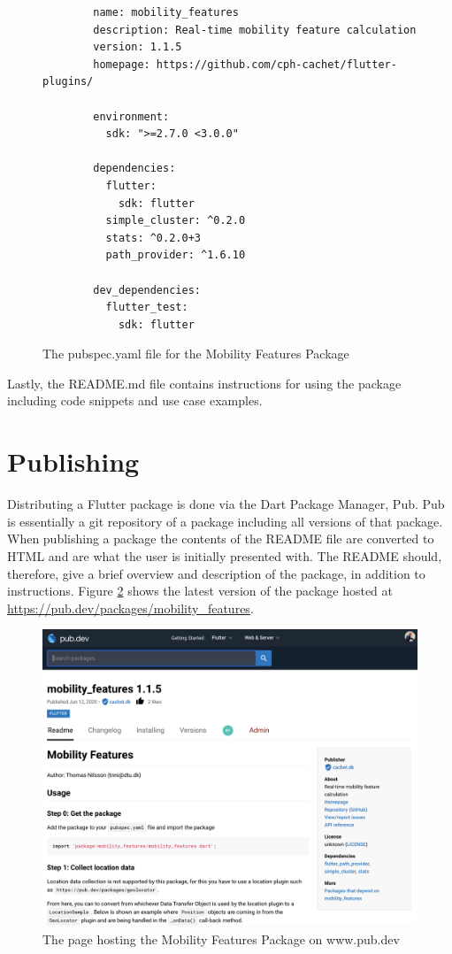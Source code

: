 \begin{figure}
    \centering
    \begin{verbatim}
        name: mobility_features
        description: Real-time mobility feature calculation
        version: 1.1.5
        homepage: https://github.com/cph-cachet/flutter-plugins/
        
        environment:
          sdk: ">=2.7.0 <3.0.0"
        
        dependencies:
          flutter:
            sdk: flutter
          simple_cluster: ^0.2.0
          stats: ^0.2.0+3
          path_provider: ^1.6.10
        
        dev_dependencies:
          flutter_test:
            sdk: flutter
    \end{verbatim}
    \caption{The pubspec.yaml file for the Mobility Features Package}
    \label{fig:pubspec}
\end{figure}

Lastly, the README.md file contains instructions for using the package including code snippets and use case examples. 

\section{Publishing}
Distributing a Flutter package is done via the Dart Package Manager, Pub. Pub is essentially a git repository of a package including all versions of that package. When publishing a package the contents of the README file are converted to HTML and are what the user is initially presented with. The README should, therefore, give a brief overview and description of the package, in addition to instructions. Figure \ref{fig:pub-package} shows the latest version of the package hosted at \url{https://pub.dev/packages/mobility_features}.

\begin{figure}
    \centering
    \includegraphics[width=\textwidth]{images/pub.png}
    \caption{The page hosting the Mobility Features Package on www.pub.dev}
    \label{fig:pub-package}
\end{figure}

